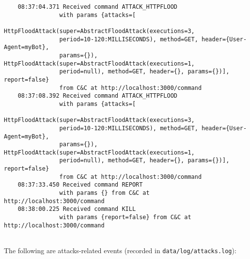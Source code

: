 
\begin{verbatim}
    08:37:04.371 Received command ATTACK_HTTPFLOOD 
                with params {attacks=[
                HttpFloodAttack(super=AbstractFloodAttack(executions=3,
                period=10-120:MILLISECONDS), method=GET, header={User-Agent=myBot},
                params={}), HttpFloodAttack(super=AbstractFloodAttack(executions=1,
                period=null), method=GET, header={}, params={})], report=false}
                from C&C at http://localhost:3000/command
    08:37:08.392 Received command ATTACK_HTTPFLOOD
                with params {attacks=[
                HttpFloodAttack(super=AbstractFloodAttack(executions=3,
                period=10-120:MILLISECONDS), method=GET, header={User-Agent=myBot},
                params={}), HttpFloodAttack(super=AbstractFloodAttack(executions=1,
                period=null), method=GET, header={}, params={})], report=false}
                from C&C at http://localhost:3000/command
    08:37:33.450 Received command REPORT
                with params {} from C&C at http://localhost:3000/command
    08:38:00.225 Received command KILL
                with params {report=false} from C&C at http://localhost:3000/command
\end{verbatim}

\noindent\\
The following are attacks-related events (recorded in \texttt{data/log/attacks.log}):


